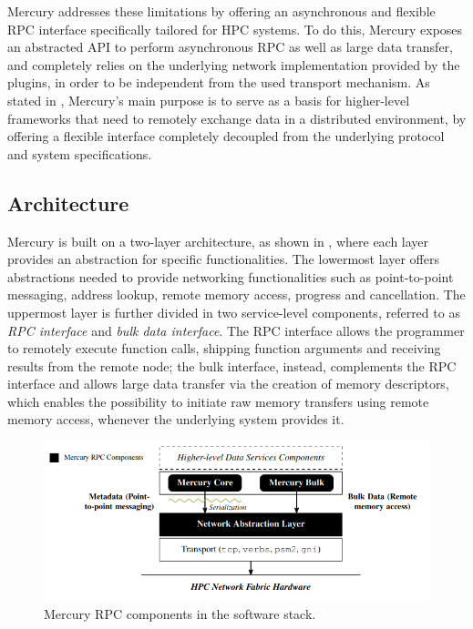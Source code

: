 Mercury addresses these limitations by offering an asynchronous and flexible RPC interface specifically tailored for HPC systems. To do this, Mercury exposes an abstracted API to perform asynchronous RPC as well as large data transfer, and completely relies on the underlying network implementation provided by the plugins, in order to be independent from the used transport mechanism. As stated in \cite{mercury}, Mercury's main purpose is to serve as a basis for higher-level frameworks that need to remotely exchange data in a distributed environment, by offering a flexible interface completely decoupled from the underlying protocol and system specifications.

\subsection{Architecture}
Mercury is built on a two-layer architecture, as shown in , where each layer provides an abstraction for specific functionalities. The lowermost layer offers abstractions needed to provide networking functionalities such as point-to-point messaging, address lookup, remote memory access, progress and cancellation. The uppermost layer is further divided in two service-level components, referred to as \textit{RPC interface} and \textit{bulk data interface}. The RPC interface allows the programmer to remotely execute function calls, shipping function arguments and receiving results from the remote node; the bulk interface, instead, complements the RPC interface and allows large data transfer via the creation of memory descriptors, which enables the possibility to initiate raw memory transfers using remote memory access, whenever the underlying system provides it.\newline
\begin{figure}[H]
    \centering
    \includegraphics[width=0.8\linewidth]{res/RPC_components.png}
    \caption{Mercury RPC components in the software stack.}
    \label{fig:mercury-rpc-components}
\end{figure}

